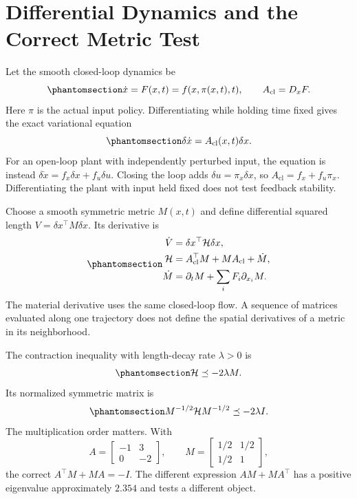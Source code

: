 \documentclass[
  10pt,
  letterpaper,
  DIV=11,
  numbers=noendperiod]{scrartcl}
\begin{document}
\section{Differential Dynamics and the Correct Metric
Test}\label{differential-dynamics-and-the-correct-metric-test}

Let the smooth closed-loop dynamics be
\begin{equation}\phantomsection\label{eq-ctu-dynamics}{
\dot x=F(x,t)=f(x,\pi(x,t),t),\qquad A_{\mathrm{cl}}=D_xF.
}\end{equation} Here \(\pi\) is the actual input policy. Differentiating
while holding time fixed gives the exact variational equation
\begin{equation}\phantomsection\label{eq-virtual-displacement}{
\delta\dot x=A_{\mathrm{cl}}(x,t)\delta x.
}\end{equation} For an open-loop plant with independently perturbed
input, the equation is instead \(\delta\dot x=f_x\delta x+f_u\delta u\).
Closing the loop adds \(\delta u=\pi_x\delta x\), so
\(A_{\mathrm{cl}}=f_x+f_u\pi_x\). Differentiating the plant with input
held fixed does not test feedback stability.

Choose a smooth symmetric metric \(M(x,t)\) and define differential
squared length \(V=\delta x^\top M\delta x\). Its derivative is
\begin{equation}\phantomsection\label{eq-distance-derivative}{
\begin{aligned}
\dot V&=\delta x^\top\mathcal H\delta x,\\
\mathcal H&=A_{\mathrm{cl}}^\top M+MA_{\mathrm{cl}}+\dot M,\\
\dot M&=\partial_tM+\sum_iF_i\partial_{x_i}M.
\end{aligned}
}\end{equation} The material derivative uses the same closed-loop flow.
A sequence of matrices evaluated along one trajectory does not define
the spatial derivatives of a metric in its neighborhood.

The contraction inequality with length-decay rate \(\lambda>0\) is
\begin{equation}\phantomsection\label{eq-contraction-condition}{
\mathcal H\preceq-2\lambda M.
}\end{equation} Its normalized symmetric matrix is
\begin{equation}\phantomsection\label{eq-generalized-jacobian}{
M^{-1/2}\mathcal H M^{-1/2}\preceq-2\lambda I.
}\end{equation} The multiplication order matters. With \[
A=\begin{bmatrix}-1&3\\0&-2\end{bmatrix},\qquad
M=\begin{bmatrix}1/2&1/2\\1/2&1\end{bmatrix},
\] the correct \(A^\top M+MA=-I\). The different expression
\(AM+MA^\top\) has a positive eigenvalue approximately \(2.354\) and
tests a different object.
\end{document}

